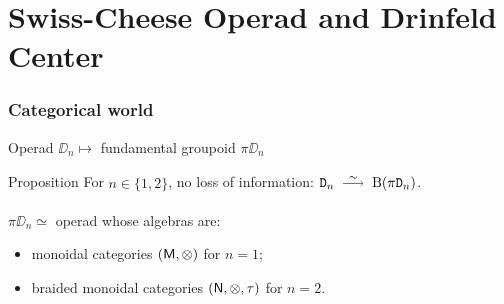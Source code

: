 \documentclass{beamer}
\begin{document}
\section{Swiss-Cheese Operad and Drinfeld Center}

\begin{frame}
  \frametitle{Categorical world}
  Operad $\DD_{n} \mapsto$ fundamental groupoid $\pi \DD_{n}$

  \begin{block}{Proposition}
    For $n \in \{ 1, 2 \}$, no loss of information: $\DD_{n} \qiso \operatorname{B} (\pi \DD_{n})$.
  \end{block}

  \pause
  \begin{theorem}
    $\pi \DD_{n} \simeq$ operad whose algebras are:
    \begin{itemize}
    \item<2-> monoidal categories $(\mathsf{M}, \otimes)$ for $n = 1$;
    \item<3-> braided monoidal categories $(\mathsf{N}, \otimes, \tau)$ for $n = 2$.
    \end{itemize}
  \end{theorem}
\end{frame}
\end{document}
